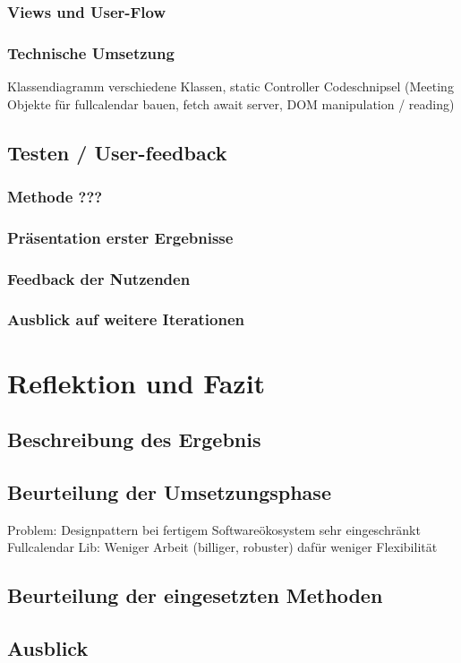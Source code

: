 \documentclass[12pt]{article}
\begin{document}
\subsubsection{Views und User-Flow}

\subsubsection{Technische Umsetzung}
Klassendiagramm verschiedene Klassen, static Controller Codeschnipsel (Meeting
Objekte für fullcalendar bauen, fetch await server, DOM manipulation / reading)

\subsection{Testen / User-feedback}
\subsubsection{Methode ???}
\subsubsection{Präsentation erster Ergebnisse}
\subsubsection{Feedback der Nutzenden}
\subsubsection{Ausblick auf weitere Iterationen}

\section{Reflektion und Fazit}
\subsection{Beschreibung des Ergebnis}
\subsection{Beurteilung der Umsetzungsphase}
Problem: Designpattern bei fertigem Softwareökosystem sehr eingeschränkt
Fullcalendar Lib: Weniger Arbeit (billiger, robuster) dafür weniger Flexibilität

\subsection{Beurteilung der eingesetzten Methoden}

\subsection{Ausblick}

\newpage



\end{document}
